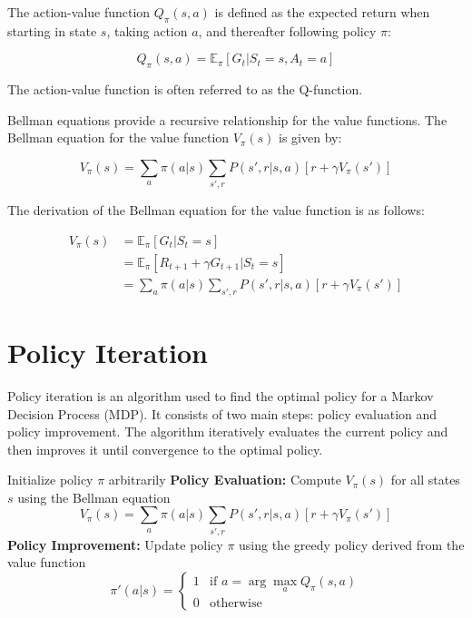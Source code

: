 \documentclass{article}
\begin{document}
The action-value function \( Q_\pi(s, a) \) is defined as the expected return when starting in state \( s \), taking action \( a \), and thereafter following policy \( \pi \):

\begin{equation}
Q_\pi(s, a) = \mathbb{E}_\pi [G_t | S_t = s, A_t = a]
\end{equation}

The action-value function is often referred to as the Q-function.


Bellman equations provide a recursive relationship for the value functions. The Bellman equation for the value function \( V_\pi(s) \) is given by:

\begin{equation}
V_\pi(s) = \sum_a \pi(a | s) \sum_{s', r} P(s', r | s, a) [r + \gamma V_\pi(s')]
\end{equation} 

The derivation of the Bellman equation for the value function is as follows:

\begin{align*}
V_\pi(s) &= \mathbb{E}_\pi [G_t | S_t = s] \\
&= \mathbb{E}_\pi [R_{t+1} + \gamma G_{t+1} | S_t = s] \\ 
&= \sum_a \pi(a | s) \sum_{s', r} P(s', r | s, a) [r + \gamma V_\pi(s')]
\end{align*}

\section{Policy Iteration}
\label{sec:policy_iteration}

Policy iteration is an algorithm used to find the optimal policy for a Markov Decision Process (MDP). It consists of two main steps: policy evaluation and policy improvement. The algorithm iteratively evaluates the current policy and then improves it until convergence to the optimal policy.

\begin{algorithm}
\caption{Policy Iteration}
\begin{algorithmic}[1]
\STATE Initialize policy \( \pi \) arbitrarily
\REPEAT
    \STATE \textbf{Policy Evaluation:} Compute \( V_\pi(s) \) for all states \( s \) using the Bellman equation
    \begin{equation}
    V_\pi(s) = \sum_a \pi(a | s) \sum_{s', r} P(s', r | s, a) [r + \gamma V_\pi(s')]
    \end{equation}
    \STATE \textbf{Policy Improvement:} Update policy \( \pi \) using the greedy policy derived from the value function
    \begin{equation}
    \pi'(a | s) = \begin{cases}
    1 & \text{if } a = \arg\max_a Q_\pi(s, a) \\
    0 & \text{otherwise}
    \end{cases}
    \end{equation}
\end{algorithmic}
\end{algorithm}
\end{document}
